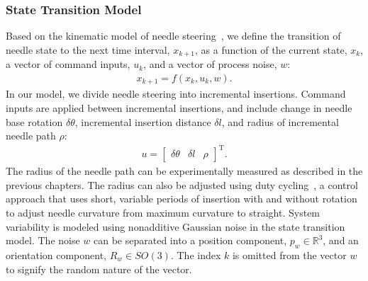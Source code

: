 \subsubsection{State Transition Model}
Based on the kinematic model of needle steering~\cite{Webster2006}, we define the transition of needle state to the next time interval, ${x_{k+1}}$, as a function of the current state, ${x_{k}}$, a vector of command inputs, ${u_{k}}$, and a vector of process noise, ${w}$:
\begin{align}
{x_{k+1}} = f({x_k}, {u_k}, {w}).
\end{align}
In our model, we divide needle steering into incremental insertions. Command inputs are applied between incremental insertions, and include change in needle base rotation $\delta\theta$, incremental insertion distance $\delta l$, and radius of incremental needle path $\rho$:
\begin{align}
{u} = \begin{bmatrix} \delta\theta & \delta l & \rho\end{bmatrix}^{\text{T}}.
\end{align}
The radius of the needle path can be experimentally measured as described in the previous chapters. The radius can also be adjusted using duty cycling~\cite{Minhas2007}, a control approach that uses short, variable periods of insertion with and without rotation to adjust needle curvature from maximum curvature to straight. System variability is modeled using nonadditive Gaussian noise in the state transition model. The noise ${w}$ can be separated into a position component, ${p_w} \in \mathbb{R}^3$, and an orientation component, ${R_w} \in SO(3)$. The index $k$ is omitted from the vector ${w}$ to signify the random nature of the vector.

